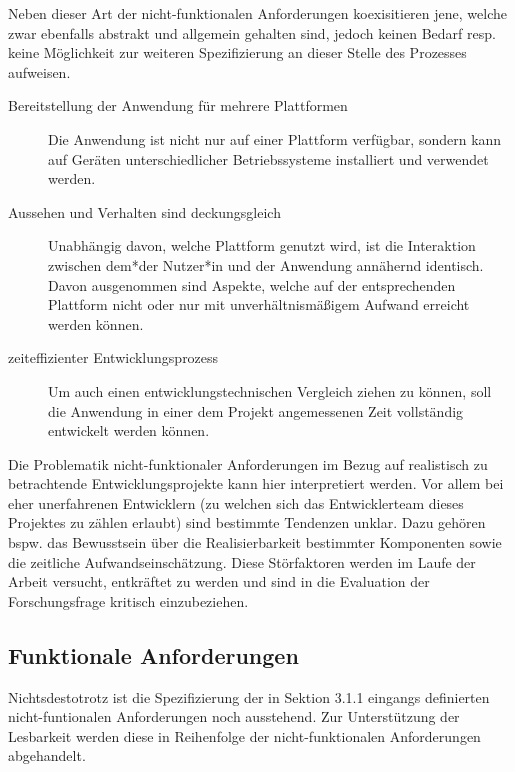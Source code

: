 Neben dieser Art der nicht-funktionalen Anforderungen koexisitieren jene, welche zwar ebenfalls abstrakt und allgemein gehalten sind, jedoch keinen Bedarf resp. keine Möglichkeit zur weiteren Spezifizierung an dieser Stelle des Prozesses aufweisen.
\begin{description}
    \item[Bereitstellung der Anwendung für mehrere Plattformen] Die Anwendung ist nicht nur auf einer Plattform verfügbar, sondern kann auf Geräten unterschiedlicher Betriebssysteme installiert und verwendet werden.
    \item[Aussehen und Verhalten sind deckungsgleich] Unabhängig davon, welche Plattform genutzt wird, ist die Interaktion zwischen dem*der Nutzer*in und der Anwendung annähernd identisch. Davon ausgenommen sind Aspekte, welche auf der entsprechenden Plattform nicht oder nur mit unverhältnismäßigem Aufwand erreicht werden können.
    \item[zeiteffizienter Entwicklungsprozess] Um auch einen entwicklungstechnischen Vergleich ziehen zu können, soll die Anwendung in einer dem Projekt angemessenen Zeit vollständig entwickelt werden können.
\end{description}
Die Problematik nicht-funktionaler Anforderungen im Bezug auf realistisch zu betrachtende Entwicklungsprojekte kann hier interpretiert werden. Vor allem bei eher unerfahrenen Entwicklern (zu welchen sich das Entwicklerteam dieses Projektes zu zählen erlaubt) sind bestimmte Tendenzen unklar. Dazu gehören bspw. das Bewusstsein über die Realisierbarkeit bestimmter Komponenten sowie die zeitliche Aufwandseinschätzung. Diese Störfaktoren werden im Laufe der Arbeit versucht, entkräftet zu werden und sind in die Evaluation der Forschungsfrage kritisch einzubeziehen.

\subsection{Funktionale Anforderungen}
Nichtsdestotrotz ist die Spezifizierung der in Sektion 3.1.1 eingangs definierten nicht-funtionalen Anforderungen noch ausstehend. Zur Unterstützung der Lesbarkeit werden diese in Reihenfolge der nicht-funktionalen Anforderungen abgehandelt.

